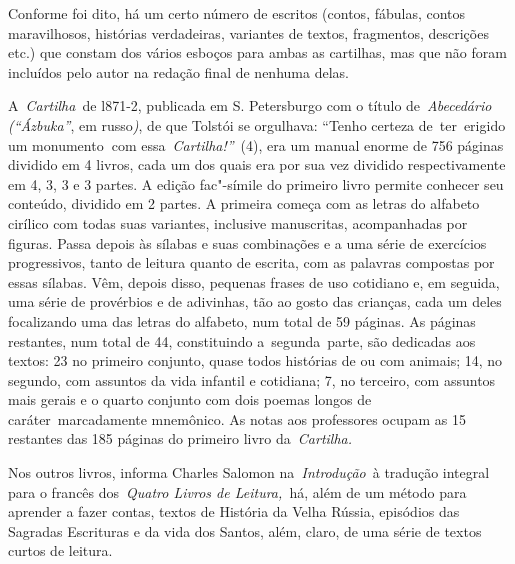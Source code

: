 Conforme foi dito, há um certo número de escritos (contos, fábulas,
contos maravilhosos, histórias verdadeiras, variantes de textos,
fragmentos, descrições etc.) que constam dos vários esboços para ambas
as cartilhas, mas que não foram incluídos pelo autor na redação final de
nenhuma delas.

A~\emph{Cartilha~}de l871-2, publicada em S. Petersburgo com o título
de~\emph{Abecedário (``Ázbuka''}, em russo\emph{)}, de que Tolstói se
orgulhava: ``Tenho certeza de~ter~erigido um monumento\textbf{~}com
essa~\emph{Cartilha!''}~(4), era um manual enorme de 756 páginas
dividido em 4 livros, cada um dos quais era por sua vez dividido
respectivamente em 4, 3, 3 e 3 partes. A edição fac"-símile do primeiro
livro permite conhecer seu conteúdo, dividido em 2 partes. A primeira
começa com as letras do alfabeto cirílico com todas suas variantes,
inclusive manuscritas, acompanhadas por figuras. Passa depois às sílabas
e suas combinações e a uma série de exercícios progressivos, tanto de
leitura quanto de escrita, com as palavras compostas por essas sílabas.
Vêm, depois disso, pequenas frases de uso cotidiano e, em seguida, uma
série de provérbios e de adivinhas, tão ao gosto das crianças, cada um
deles focalizando uma das letras do alfabeto, num total de 59 páginas.
As páginas restantes, num total de 44, constituindo a~segunda~parte, são
dedicadas aos textos: 23 no primeiro conjunto, quase todos histórias de
ou com animais; 14, no segundo, com assuntos da vida infantil e
cotidiana; 7, no terceiro, com assuntos mais gerais e o quarto conjunto
com dois poemas longos de caráter~marcadamente mnemônico. As notas aos
professores ocupam as 15 restantes das 185 páginas do primeiro livro
da~\emph{Cartilha.}

Nos outros livros, informa Charles Salomon na\emph{~Introdução}~à
tradução integral para o francês dos~\emph{Quatro Livros de
Leitura,~}há, além de um método para aprender a fazer contas, textos de
História da Velha Rússia, episódios das Sagradas Escrituras e da vida
dos Santos, além, claro, de uma série de textos curtos de leitura.

